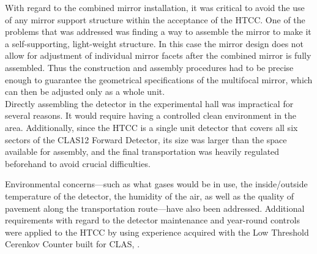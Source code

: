 \indent With regard to the combined mirror installation, it was critical to avoid the use of any mirror support structure within the acceptance of the HTCC. One of the problems that was addressed was finding a way to assemble the mirror to make it a self-supporting, light-weight structure. In this case the mirror design does not allow for adjustment of individual mirror facets after the combined mirror is fully assembled. Thus the construction and assembly procedures had to be precise enough to guarantee the geometrical specifications of the multifocal mirror, which can then be adjusted only as a whole unit. \\
\indent Directly assembling the detector in the experimental hall was impractical for several reasons. It would require having a controlled clean environment in the area. Additionally, since the HTCC is a single unit detector that covers all six sectors of the CLAS12 Forward Detector, its size was larger than the space available for assembly, and the final transportation was heavily regulated beforehand to avoid crucial difficulties. 
 
 Environmental concerns---such as what gases would be in use, the inside/outside temperature of the detector, the humidity of the air, as well as the quality of pavement along the transportation route---have also been addressed. Additional requirements with regard to the detector maintenance and year-round controls were applied to the HTCC by using experience acquired with the Low Threshold Cerenkov Counter built for CLAS, \cite{youris}.


